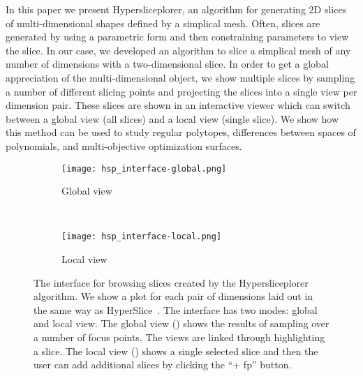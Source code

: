 

In this paper we present Hypersliceplorer, an algorithm for generating 2D
slices of multi-dimensional shapes defined by a simplical mesh.  Often, slices
are generated by using a parametric form and then constraining parameters to
view the slice. In our case, we developed an algorithm to slice a simplical
mesh of any number of dimensions with a two-dimensional slice.  In order to get
a global appreciation of the multi-dimensional object, we show multiple slices
by sampling a number of different slicing points and projecting the slices into
a single view per dimension pair. These slices are shown in an interactive
viewer which can switch between a global view (all slices) and a local view
(single slice). We show how this method can be used to study regular polytopes,
differences between spaces of polynomials, and multi-objective optimization
surfaces. 

\begin{figure}
  \centering
  \begin{subfigure}[b]{0.45\linewidth}
    \texttt{[image: hsp\_interface-global.png]}
    \caption{Global view}
    \label{fig:interface:global} 
  \end{subfigure} 
  ~
  \begin{subfigure}[b]{0.45\linewidth}
    \texttt{[image: hsp\_interface-local.png]}
    \caption{Local view}
    \label{fig:interface:local} 
  \end{subfigure}
  \caption[The interface for browsing slices created by the Hypersliceplorer algorithm.]{%
    The interface for browsing slices created by the Hypersliceplorer algorithm.
    We show a plot for each pair of dimensions laid out in the same way as
    HyperSlice~\cite{Wijk:1993}.
    The interface has two modes: global and local view.
    The global view () 
    shows the results of sampling over a number of focus points. The views
    are linked through highlighting a slice. The local view 
    () shows a single selected slice and then
    the user can add additional slices by clicking the ``+ fp'' button.
  }
  \label{fig:interface}
\end{figure}

